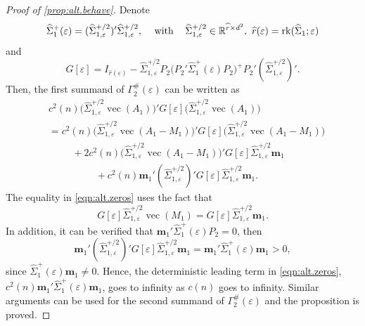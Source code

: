 \documentclass[12pt]{article}
\numberwithin{equation}{section}
\numberwithin{table}{section}
\numberwithin{thm}{section}
\numberwithin{defn}{section}
\numberwithin{lem}{section}
\numberwithin{prop}{section}
\numberwithin{cor}{section}
\numberwithin{rem}{section}
\DeclareMathOperator{\Vector}{vec}
\newcommand{\rank}{\operatorname{rk}}
\begin{document}
\begin{appendix}
\begin{proof}[Proof of \autoref{prop:alt.behave}]
Denote
\begin{equation}\label{eqn:sigmaHalf}
    \widehat{\Sigma}_1^+(\varepsilon) = (\widehat{\Sigma}_{1,\varepsilon}^{+/2})' \widehat{\Sigma}_{1, \varepsilon}^{+/2}, \hspace{0.3cm} \text{ with } \hspace{0.3cm} \widehat{\Sigma}_{1,\varepsilon}^{+/2} \in \mathbb{R}^{\widehat{r} \times d^2}, ~ \widehat{r}(\varepsilon) = \rank(\widehat{\Sigma}_1; \varepsilon)
\end{equation}
and
$$
G[\varepsilon] = I_{\widehat{r}(\varepsilon)} - \widehat{\Sigma}_{1,\varepsilon}^{+/2} P_2 \big(P_2' \widehat{\Sigma}_1^+(\varepsilon) P_2\big)^+ P_2' (\widehat{\Sigma}_{1,\varepsilon}^{+/2})'.
$$
Then, the first summand of $\Gamma_2^\#(\varepsilon)$ can be written as
\begin{equation} \label{eqn:alt.zeros}
\begin{aligned}
    &c^2(n) \big(\widehat{\Sigma}_{1,\varepsilon}^{+/2} \Vector(A_1)\big)' G[\varepsilon] \big(\widehat{\Sigma}_{1,\varepsilon}^{+/2} \Vector(A_1)\big)\\
    &=c^2(n) \big(\widehat{\Sigma}_{1,\varepsilon}^{+/2} \Vector(A_1 - M_1)\big)' G[\varepsilon] \big(\widehat{\Sigma}_{1,\varepsilon}^{+/2} \Vector(A_1 - M_1)\big)\\
    & \hspace{1cm}
    + 2 c^2(n) \big(\widehat{\Sigma}_{1,\varepsilon}^{+/2} \Vector(A_1 - M_1)\big)' G[\varepsilon] \widehat{\Sigma}_{1,\varepsilon}^{+/2} \bm{m}_1\\
    & \hspace{2cm}+ c^2(n) \bm{m}_1' (\widehat{\Sigma}_{1,\varepsilon}^{+/2})' G[\varepsilon]
     \widehat{\Sigma}_{1,\varepsilon}^{+/2} \bm{m}_1.
\end{aligned}
\end{equation}
The equality in \eqref{eqn:alt.zeros} uses the fact that
$$
G[\varepsilon] \widehat{\Sigma}_{1,\varepsilon}^{+/2} \Vector(M_1) = G[\varepsilon] \widehat{\Sigma}_{1,\varepsilon}^{+/2} \bm{m}_1.
$$
In addition, it can be verified that $\bm{m}_1' \widehat{\Sigma}_1^+(\varepsilon) P_2 = 0$, then
$$
\bm{m}_1' (\widehat{\Sigma}_{1,\varepsilon}^{+/2})' G[\varepsilon] \widehat{\Sigma}_{1,\varepsilon}^{+/2} \bm{m}_1 = \bm{m}_1' \widehat{\Sigma}_1^+(\varepsilon) \bm{m}_1 > 0,
$$
since $\widehat{\Sigma}_1^+(\varepsilon) \bm{m}_1 \neq 0$. Hence, the deterministic leading term in \eqref{eqn:alt.zeros}, $c^2(n) \bm{m}_1' \widehat{\Sigma}_1^+(\varepsilon) \bm{m}_1$, goes to infinity as $c(n)$ goes to infinity. Similar arguments can be used for the second summand of $\Gamma_2^\#(\varepsilon)$ and the proposition is proved.
\end{proof}




\end{appendix}
\end{document}
